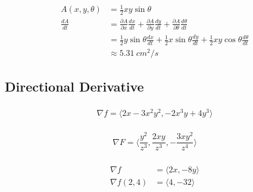 \documentclass{article}
\begin{document}
\setcounter{subsubsection}{56}
\subsubsection{}

\begin{align*}
  A(x, y, \theta) & = \frac{1}{2} x y \sin \theta                                                                                                                             \\
  \frac{d A}{d t} & = \frac{\partial A}{\partial x} \frac{d x}{d t} + \frac{\partial A}{\partial y} \frac{d y}{d t} + \frac{\partial A}{\partial \theta} \frac{d \theta}{d t} \\
                  & = \frac{1}{2} y \sin \theta \frac{d x}{d t} + \frac{1}{2} x \sin \theta \frac{d y}{d t} + \frac{1}{2} x y \cos \theta \frac{d \theta}{d t}                \\
                  & \approx \qty{5.31}{cm^2/s}
\end{align*}

\subsection{Directional Derivative}

\subsubsection{}

\[\nabla f = \langle 2 x - 3 x^2 y^2, -2 x^3 y + 4 y^3 \rangle\]

\setcounter{subsubsection}{2}
\subsubsection{}

\[\nabla F = \langle \frac{y^2}{z^3}, \frac{2 x y}{z^3}, -\frac{3 x y^2}{z^4} \rangle\]

\setcounter{subsubsection}{4}
\subsubsection{}

\begin{align*}
  \nabla f        & = \langle 2 x, -8 y \rangle \\
  \nabla f (2, 4) & = \langle 4, -32 \rangle
\end{align*}

\setcounter{subsubsection}{6}
\subsubsection{}
\end{document}
